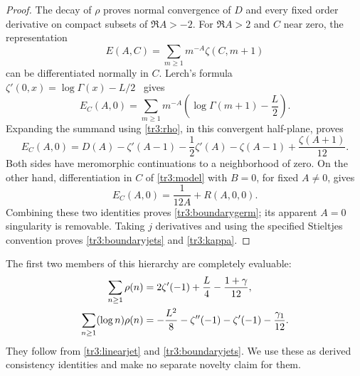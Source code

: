 \begin{proof}
The decay of $\rho$ proves normal convergence of $D$ and every fixed
order derivative on compact subsets of $\Re A>-2$.  For $\Re A>2$
and $C$ near zero, the representation
\[
 E(A,C)=\sum_{m\geq1}m^{-A}\zeta(C,m+1)
\]
can be differentiated normally in $C$.  Lerch's formula
$\zeta'(0,x)=\log\Gamma(x)-L/2$~\cite[(25.11.18)]{tr3:DLMF} gives
\[
 E_C(A,0)=\sum_{m\geq1}m^{-A}
            \left(\log\Gamma(m+1)-\frac L2\right).
\]
Expanding the summand using \eqref{tr3:rho}, in this convergent
half-plane, proves
\[
 E_C(A,0)=D(A)-\zeta'(A-1)-\frac12\zeta'(A)
          -\zeta(A-1)+\frac{\zeta(A+1)}{12}.
\]
Both sides have meromorphic continuations to a neighborhood of zero.
On the other hand, differentiation in $C$ of \eqref{tr3:model} with
$B=0$, for fixed $A\ne0$, gives
\[
 E_C(A,0)=\frac{1}{12A}+R(A,0,0).
\]
Combining these two identities proves \eqref{tr3:boundarygerm}; its
apparent $A=0$ singularity is removable.  Taking $j$ derivatives and
using the specified Stieltjes convention proves
\eqref{tr3:boundaryjets} and \eqref{tr3:kappa}.
\end{proof}

The first two members of this hierarchy are completely evaluable:
\begin{align}\label{tr3:lowGamma}
 \sum_{n\geq1}\rho(n)
   &=2\zeta'(-1)+\frac L4-\frac{1+\gamma}{12},\notag\\
 \sum_{n\geq1}(\log n)\rho(n)
   &=-\frac{L^2}{8}-\zeta''(-1)-\zeta'(-1)-\frac{\gamma_1}{12}.
\end{align}
They follow from \eqref{tr3:linearjet} and
\eqref{tr3:boundaryjets}.  We use these as derived consistency
identities and make no separate novelty claim for them.

